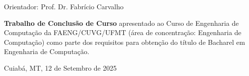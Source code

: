 \begin{titlepage}
\begin{center}
\vfill

\normalsize

Orientador: Prof. Dr. Fabrício Carvalho

\vfill

\hfill
\parbox{0.5\linewidth}{\textbf{%
Trabalho de Conclusão de Curso}
apresentado ao Curso de Engenharia de Computação da FAENG/CUVG/UFMT
(área de concentração: Engenharia de Computação)
como parte dos requisitos para obtenção do título de Bacharel
em Engenharia de Computação.}

\vfill

\large

Cuiabá, MT, 12 de Setembro de 2025

\end{center}

\end{titlepage}
